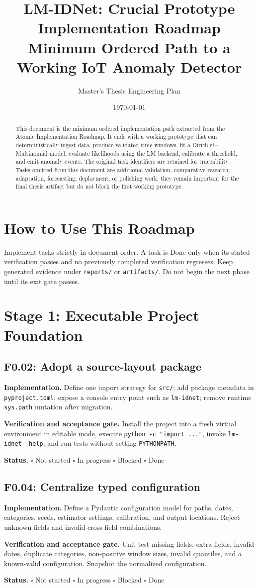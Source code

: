 \documentclass[11pt,a4paper]{article}
\title{LM-IDNet: Crucial Prototype Implementation Roadmap\\
\large Minimum Ordered Path to a Working IoT Anomaly Detector}
\author{Master's Thesis Engineering Plan}
\date{\today}
\newcommand{\status}{\(\square\) Not started \quad \(\square\) In progress \quad
  \(\square\) Blocked \quad \(\square\) Done}
\newcommand{\task}[4]{%
  \subsection{#1: #2}
  \textbf{Implementation.} #3

  \textbf{Verification and acceptance gate.} #4

  \textbf{Status.} \status
}
\newcommand{\artifact}[1]{\texttt{#1}}
\begin{document}
\maketitle

\begin{abstract}
This document is the minimum ordered implementation path extracted from the
Atomic Implementation Roadmap. It ends with a working prototype that can
deterministically ingest data, produce validated time windows, fit a
Dirichlet--Multinomial model, evaluate likelihoods using the LM backend,
calibrate a threshold, and emit anomaly events. The original task identifiers
are retained for traceability. Tasks omitted from this document are additional
validation, comparative research, adaptation, forecasting, deployment, or
polishing work; they remain important for the final thesis artifact but do not
block the first working prototype.
\end{abstract}

\tableofcontents
\newpage

\section{How to Use This Roadmap}

Implement tasks strictly in document order. A task is Done only when its stated
verification passes and no previously completed verification regresses. Keep
generated evidence under \artifact{reports/} or \artifact{artifacts/}. Do not
begin the next phase until its exit gate passes.

\section{Stage 1: Executable Project Foundation}

\task{F0.02}{Adopt a source-layout package}{Define one import strategy for
\artifact{src/}; add package metadata in \artifact{pyproject.toml}; expose a
console entry point such as \artifact{lm-idnet}; remove runtime
\artifact{sys.path} mutation after migration.}{Install the project into a fresh
virtual environment in editable mode, execute \artifact{python -c "import ..."},
invoke \artifact{lm-idnet --help}, and run tests without setting
\artifact{PYTHONPATH}.}

\task{F0.04}{Centralize typed configuration}{Define a Pydantic configuration
model for paths, dates, categories, seeds, estimator settings, calibration, and
output locations. Reject unknown fields and invalid cross-field combinations.}
{Unit-test missing fields, extra fields, invalid dates, duplicate categories,
non-positive window sizes, invalid quantiles, and a known-valid configuration.
Snapshot the normalized configuration.}
\end{document}
